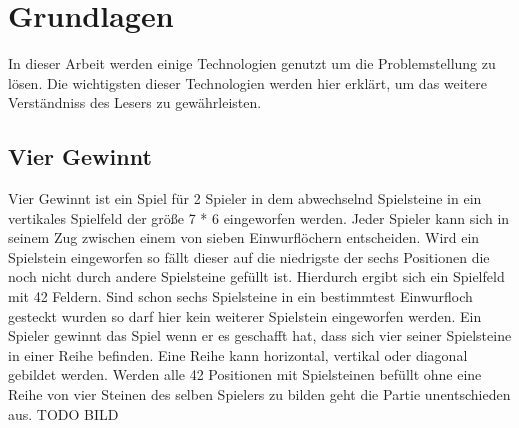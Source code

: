 \chapter{Grundlagen}%

\label{cha:Schluss}

In dieser Arbeit werden einige Technologien genutzt um die Problemstellung zu lösen.
Die wichtigsten dieser Technologien werden hier erklärt, um das weitere Verständniss des Lesers zu gewährleisten. 


\section{Vier Gewinnt}
Vier Gewinnt ist ein Spiel für 2 Spieler in dem abwechselnd Spielsteine in ein vertikales Spielfeld der größe 7 * 6 eingeworfen werden. Jeder Spieler kann sich in seinem Zug zwischen einem von sieben Einwurflöchern entscheiden. Wird ein Spielstein eingeworfen so fällt dieser auf die niedrigste der sechs Positionen die noch nicht durch andere Spielsteine gefüllt ist. Hierdurch ergibt sich ein Spielfeld mit 42 Feldern.  Sind schon sechs Spielsteine in ein bestimmtest Einwurfloch gesteckt wurden so darf hier kein weiterer Spielstein eingeworfen werden. Ein Spieler gewinnt das Spiel wenn er es geschafft  hat, dass sich vier seiner Spielsteine in einer Reihe befinden. Eine Reihe kann horizontal, vertikal oder diagonal gebildet werden. Werden alle 42 Positionen mit Spielsteinen befüllt ohne eine Reihe von vier Steinen des selben Spielers zu bilden geht die Partie unentschieden aus.
\colorbox{red!30}{TODO BILD}


